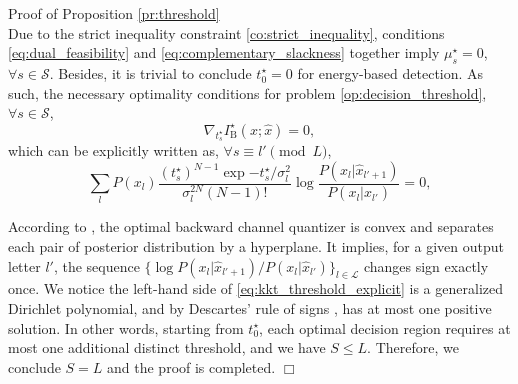\documentclass[journal]{IEEEtran}
\renewcommand{\qedsymbol}{\hfill\ensuremath{\Box}}
\begin{document}
\begin{appendix}
\begin{subsection}{Proof of Proposition \ref{pr:threshold}}
\begin{subequations}
		\end{subequations}
		Due to the strict inequality constraint \eqref{co:strict_inequality}, conditions \eqref{eq:dual_feasibility} and \eqref{eq:complementary_slackness} together imply $\mu_s^\star = 0$, $\forall s \in \mathcal{S}$.
		Besides, it is trivial to conclude $t_0^\star = 0$ for energy-based detection.
		As such, the necessary optimality conditions for problem \eqref{op:decision_threshold}, $\forall s \in \mathcal{S}$,
		\begin{equation}
			\nabla_{t_{s}^\star} I^\star_{\mathrm{B}}(x;\hat{x}) = 0,
		\end{equation}
		which can be explicitly written as, $\forall s \equiv l' \pmod L$,
		\begin{equation}
			\sum_l P(x_l) \frac{(t_s^\star)^{N-1} \exp{-t_s^\star/\sigma_l^2}}{\sigma_l^{2N} (N-1)!} \log \frac{P(x_l|\hat{x}_{l'+1})}{P(x_l|\hat{x}_{l'})} = 0,
			\label{eq:kkt_threshold_explicit}
		\end{equation}

		According to \cite{He2021}, the optimal backward channel quantizer is convex and separates each pair of posterior distribution by a hyperplane.
		It implies, for a given output letter $l'$, the sequence $\{\log {P(x_l|\hat{x}_{l'+1})}/{P(x_l|\hat{x}_{l'})}\}_{l \in \mathcal{L}}$ changes sign exactly once.
		We notice the left-hand side of \eqref{eq:kkt_threshold_explicit} is a generalized Dirichlet polynomial, and by Descartes' rule of signs \cite{Jameson2006}, has at most one positive solution.
		In other words, starting from $t_0^\star$, each optimal decision region requires at most one additional distinct threshold, and we have $S \le L$.
		Therefore, we conclude $S = L$ and the proof is completed.
		\qedsymbol
		\label{ap:threshold}
	\end{subsection}
\end{appendix}




\end{document}
